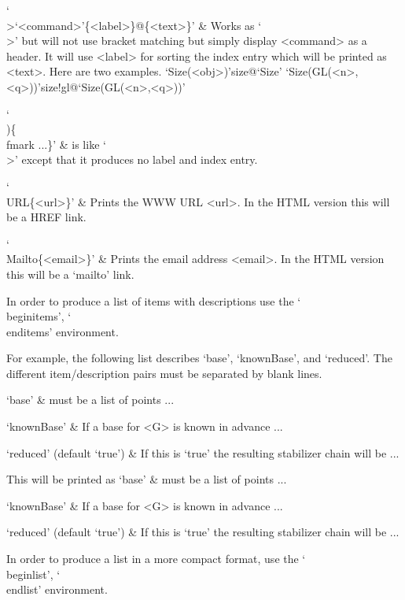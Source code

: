 `\\>{`<command>'}\{<label>\}@\{<text>\}' &
    Works as `\\>' but will not use bracket matching but simply display
    <command> as a header.
    It will use <label> for sorting the index entry which will be printed
    as <text>.
    Here are two examples.
\begintt
\>`Size(<obj>)'{size}@{`Size'}
\>`Size(GL(<n>,<q>))'{size!gl}@{`Size(GL(<n>,<q>))'}
\endtt

`\\)\{\\fmark ...\}' &
    is like `\\>' except that it produces no label and index entry.

`\\URL\{<url>\}' &
Prints the WWW URL <url>. In the HTML version this will be a HREF link.

`\\Mailto\{<email>\}' &
Prints the email address <email>. In the HTML version this will be a
`mailto' link.
\enditems


In order  to   produce  a  list   of  items with   descriptions  use  the
`\\beginitems', `\\enditems' environment.

For example, the   following  list describes   `base', `knownBase',  and
`reduced'.
The different item/description pairs must be separated by blank lines.

\begintt
\beginitems
`base' &
    must be a  list of points ...

`knownBase' &
    If a base for <G> is known in advance ...

`reduced' (default `true') &
    If this is `true' the resulting stabilizer chain will be ...
\enditems
\endtt

This will be printed as
\beginitems
`base' &
    must be a  list of points ...

`knownBase' &
    If a base for <G> is known in advance ...

`reduced' (default `true') &
    If this is `true' the resulting stabilizer chain will be ...
\enditems


In order to produce a list in a more compact format,
use the `\\beginlist', `\\endlist' environment.

